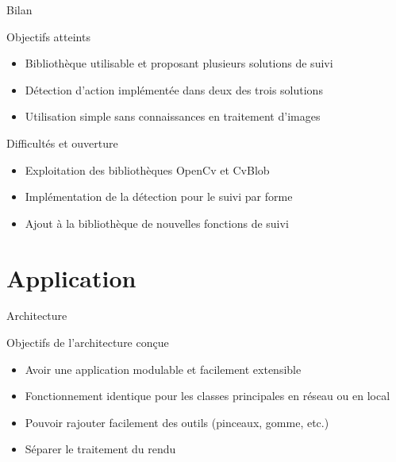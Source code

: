 \documentclass{beamer}
\begin{document}
		\begin{frame}{Bilan}
			\begin{exampleblock}{Objectifs atteints}
				\begin{itemize}
				\item Bibliothèque utilisable et proposant plusieurs solutions de suivi
				\item Détection d'action implémentée dans deux des trois solutions
				\item Utilisation simple sans connaissances en traitement d'images
				\end{itemize}
			\end{exampleblock}
			\pause
			\begin{alertblock}{Difficultés et ouverture}
				\begin{itemize}
				\item Exploitation des bibliothèques OpenCv et CvBlob 
				\item Implémentation de la détection pour le suivi par forme
				\item Ajout à la bibliothèque de nouvelles fonctions de suivi
				\end{itemize}
			\end{alertblock}
		\end{frame}
	
	\section{Application}
		\begin{frame}{Architecture}
			\begin{block}{Objectifs de l'architecture conçue}
				\begin{itemize}
				\item{Avoir une application modulable et facilement extensible}
				\item{Fonctionnement identique pour les classes principales en réseau ou en local}
				\item{Pouvoir rajouter facilement des outils (pinceaux, gomme, etc.)}
				\item{Séparer le traitement du rendu}
				\end{itemize}
			\end{block}
		\end{frame}
		
\end{document}
